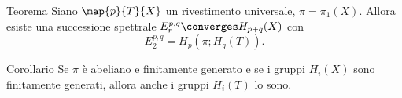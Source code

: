 \begin{frame}
\frametitle{\secname}
\begin{block}{Teorema}
Siano \(\map{p}{T}{X}\) un rivestimento universale, \(\pi=\pi_1(X)\). Allora esiste una successione spettrale \(E^{p,q}_r\converges H_{p+q}(X)\) con
\[
E^{p,q}_2=H_p(\pi;H_q(T)).
\]
\end{block}
\pause
\begin{block}{Corollario}
Se \(\pi\) è abeliano e finitamente generato e se i gruppi \(H_i(X)\) sono finitamente generati, allora anche i gruppi \(H_i(T)\) lo sono.
\end{block}
\end{frame}